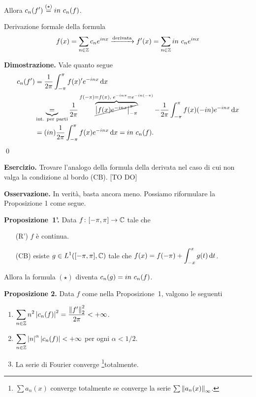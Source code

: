 Allora $\displaystyle c_n(f') \overset{(\star)}{=} in \ c_n(f)$.

Derivazione formale della formula
%
$$
f(x) = \sum_{n \in \mathbb Z} c_n e^{inx} \xrightarrow{\text{derivata}} f'(x) = \sum_{n \in \mathbb Z} in \ c_n e^{inx} 
$$
%

\textbf{Dimostrazione.} Vale quanto segue
\begin{align*}
c_n(f') & = \frac{1}{2\pi} \int_{-\pi}^\pi f(x)' e^{-inx} \dd x \\
& \underbrace{=}_{\text{int. per parti}} \frac{1}{2\pi} \overbrace{\cancel{\left| f(x) e^{-inx} \right|_{-\pi}^\pi}}^{f(-\pi) = f(\pi), \; e^{-in\pi} = e^{-in (-\pi)}} - \frac{1}{2\pi} \int_{-\pi}^\pi f(x) (-in) e^{-inx} \dd x \\
& = (in) \frac{1}{2\pi} \int_{-\pi}^\pi f(x) e^{-inx} \dd x = in \ c_n(f).
\end{align*} 
\qed

\textbf{Esercizio.} Trovare l'analogo della formula della derivata nel caso di cui non valga la condizione al bordo (CB). [TO DO]

\textbf{Osservazione.} In verità, basta ancora meno. Possiamo riformulare la Proposizione 1 come segue.

\textbf{Proposizione~1'.} Data $f \colon [-\pi,\pi] \to \mathbb C$ tale che
\begin{itemize}
	\item[(R')] $f$ è continua.

	\item[(CB)] esiste $\displaystyle g \in L^1([-\pi,\pi], \mathbb C)$ tale che $\displaystyle f(x) = f(-\pi) + \int_{-x}^x g(t) \,\mathrm{d} t $.

\end{itemize}
Allora la formula $(\star)$ diventa $\displaystyle c_n(g) = in \ c_n(f)$.

\vs

\textbf{Proposizione 2.} Data $f$ come nella Proposizione~1, valgono le seguenti
\begin{enumerate}
\item $\displaystyle \sum_{n \in \mathbb Z} n^2 \left| c_n(f) \right|^2 = \frac{\left\lVert f' \right\rVert_2^2}{2\pi} < +\infty$.

\item $\displaystyle \sum_{n \in \mathbb Z} \left| n \right|^\alpha \left| c_n(f) \right| < +\infty $ per ogni $\alpha < 1/2$.

\item La serie di Fourier converge \footnote{$\sum a_n(x)$ converge totalmente se converge la serie $\sum \left\lVert a_n (x) \right\rVert_\infty$.}{totalmente}.
\end{enumerate}

